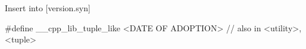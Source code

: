 \documentclass{wg21}
\begin{document}
Insert into [version.syn]

\begin{addedblock}
\begin{codeblock}
#define __cpp_lib_tuple_like <DATE OF ADOPTION> // also in <utility>, <tuple>
\end{codeblock}
\end{addedblock}

%
%
%
%
%
\end{document}
